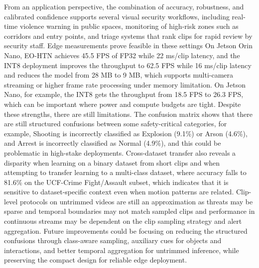 \documentclass[AMA,Times1COL]{WileyNJDv5} %
\begin{document}
From an application perspective, the combination of accuracy, robustness, and calibrated confidence supports several visual security workflows, including real-time violence warning in public spaces, monitoring of high-risk zones such as corridors and entry points, and triage systems that rank clips for rapid review by security staff. Edge measurements prove feasible in these settings On Jetson Orin Nano, EO-HTN achieves 45.5 FPS of FP32 while 22 ms/clip latency, and the INT8 deployment improves the throughput to 62.5 FPS while 16 ms/clip latency and reduces the model from 28 MB to 9 MB, which supports multi-camera streaming or higher frame rate processing under memory limitation. On Jetson Nano, for example, the INT8 gets the throughput from 18.5 FPS to 26.3 FPS, which can be important where power and compute budgets are tight. Despite these strengths, there are still limitations. The confusion matrix shows that there are still structured confusions between some safety-critical categories, for example, Shooting is incorrectly classified as Explosion (9.1\%) or Arson (4.6\%), and Arrest is incorrectly classified as Normal (4.9\%), and this could be problematic in high-stake deployments. Cross-dataset transfer also reveals a disparity when learning on a binary dataset from short clips and when attempting to transfer learning to a multi-class dataset, where accuracy falls to 81.6\% on the UCF-Crime Fight/Assault subset, which indicates that it is sensitive to dataset-specific context even when motion patterns are related. Clip-level protocols on untrimmed videos are still an approximation as threats may be sparse and temporal boundaries may not match sampled clips and performance in continuous streams may be dependent on the clip sampling strategy and alert aggregation. Future improvements could be focusing on reducing the structured confusions through class-aware sampling, auxiliary cues for objects and interactions, and better temporal aggregation for untrimmed inference, while preserving the compact design for reliable edge deployment.
\end{document}

